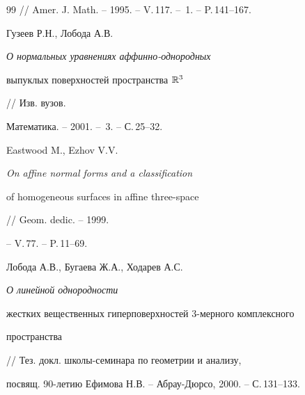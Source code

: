 \begin{thebibliography}{99}
// Amer. J. Math. -- 1995. -- V.\,117. -- \No\,1. -- P.\,141--167. 




Гузеев Р.Н., Лобода А.В. {\em О нормальных уравнениях аффинно-однородных 


выпуклых поверхностей пространства $ \Bbb R^3 $} // Изв. вузов.


Математика. -- 2001. -- \No\,3. -- С.\,25--32. 




Eastwood M., Ezhov V.V. {\em On affine normal forms and a classification


of homogeneous surfaces in affine three-space} // Geom. dedic. -- 1999.


-- V.\,77. -- P.\,11--69.




Лобода А.В., Бугаева Ж.А., Ходарев А.С. {\em О линейной однородности


жестких вещественных гиперповерхностей $3$-мерного комплексного 


пространства} // Тез. докл. школы-семинара по геометрии и анализу, 


посвящ. 90-летию Ефимова Н.В. -- Абрау-Дюрсо, 2000. -- С.\,131--133.





\end{thebibliography}





\vskip 2cm














\label{end}








